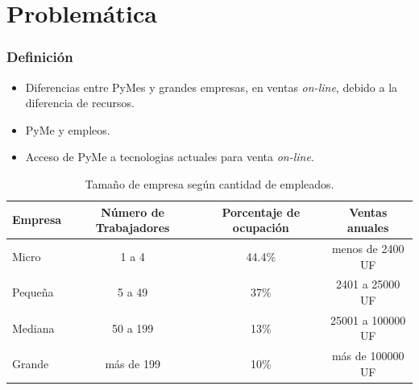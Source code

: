 \documentclass[10pt, compress]{beamer}
\begin{document}
\section{Problemática}
\begin{frame}
\frametitle{Definición}
        \begin{itemize}[<+- | alert@+>]
          \item Diferencias entre PyMes y grandes empresas, en ventas \emph{on-line}, debido a la diferencia de recursos.
	  \item PyMe y empleos.
	  \item Acceso de PyMe a tecnologias actuales para venta \emph{on-line}.
        \end{itemize}

\begin{table}[h]
\footnotesize
\centering
\begin{tabular}{|l|c|c|c|}
\hline
{\bf Empresa}  & {\bf Número de Trabajadores} & {\bf Porcentaje de ocupación} & {\bf Ventas anuales}\\
\hline
Micro    & 1 a 4                & 44.4\%  & menos de 2400 UF\\
\hline
Pequeña  & 5 a 49               & 37\%  & 2401 a 25000 UF\\
\hline
Mediana  & 50 a 199             & 13\%  & 25001 a 100000 UF\\
\hline
Grande   & más de 199           & 10\%  & más de 100000 UF\\
\hline
\end{tabular}
\caption{Tamaño de empresa según cantidad de empleados.}
\label{tab:tam_empresa}
\end{table}
\end{frame}
\end{document}
